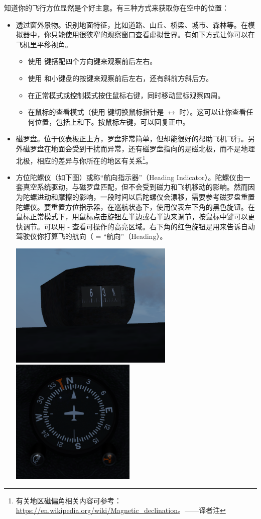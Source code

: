 知道你的飞行方位显然是个好主意。有三种方式来获取你在空中的位置：
\begin{itemize}
    \item 透过窗外景物。识别地面特征，比如道路、山丘、桥梁、城市、森林等。在模拟器中，你只能使用很狭窄的观察窗口查看虚拟世界。有如下方式让你可以在飞机里平移视角。
    \begin{itemize}
        \item 使用  键搭配四个方向键来观察前后左右。
        \item 使用  和小键盘的按键来观察前后左右，还有斜前方斜后方。
        \item 在正常模式或控制模式按住鼠标右键，同时移动鼠标观察四周。
        \item 在鼠标的查看模式（使用  键切换鼠标指针是 $\leftrightarrow$ 时）。这可以让你查看任何位置，包括上和下。按鼠标左键，可以回复正中。
\end{itemize}
\item 磁罗盘。位于仪表板正上方，罗盘非常简单，但却能很好的帮助飞机飞行。另外磁罗盘在地面会受到干扰而异常，还有磁罗盘指向的是磁北极，而不是地理北极，相应的差异与你所在的地区有关系\footnote{有关地区磁偏角相关内容可参考：\url{https://en.wikipedia.org/wiki/Magnetic_declination}。——译者注}。

\item 方位陀螺仪（如下图）或称“航向指示器”（Heading Indicator）。陀螺仪由一套真空系统驱动，与磁罗盘匹配，但不会受到磁力和飞机移动的影响。然而因为陀螺进动和摩擦的影响，一段时间以后陀螺仪会漂移，需要参考磁罗盘重置陀螺仪。要重置方位指示器，在巡航状态下，使用仪表左下角的黑色旋钮。在鼠标正常模式下，用鼠标点击旋钮左半边或右半边来调节，按鼠标中键可以更快调节。可以用 - 查看可操作的高亮区域。右下角的红色旋钮是用来告诉自动驾驶仪你打算飞的航向（\textcolor{red}{} = “航向”（Heading）。

\centerline{
  \includegraphics[height=6.0cm]{img/basic_tutorial/compass}
  \includegraphics[height=6.0cm]{img/basic_tutorial/DG}
}


\end{itemize}
